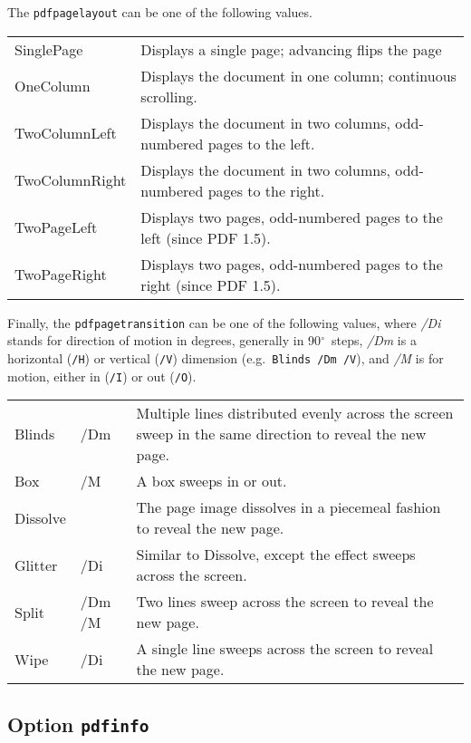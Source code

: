 \documentclass[pdftex]{article}
\begin{document}
The \texttt{pdfpagelayout} can be one of the following values.

\begin{longtable}{@{}>{\ttfamily}lp{10cm}@{}}
SinglePage     & Displays a single page; advancing flips the page \\
OneColumn      & Displays the document in one column; continuous scrolling. \\
TwoColumnLeft  & Displays the document in two columns, odd-numbered pages to the left. \\
TwoColumnRight & Displays the document in two columns, odd-numbered pages to the right.\\
TwoPageLeft    & Displays two pages, odd-numbered pages to the left (since PDF 1.5).\\
TwoPageRight   & Displays two pages, odd-numbered pages to the right (since PDF 1.5).
\end{longtable}

Finally, the \texttt{pdfpagetransition} can be one of the following
values, where \textit{/Di} stands for direction of motion in degrees,
generally in 90$^{\circ}$\ steps, \textit{/Dm} is a horizontal
(\texttt{/H}) or vertical (\texttt{/V}) dimension (e.g.\ \texttt{Blinds
/Dm /V}), and \textit{/M} is for motion, either in (\texttt{/I}) or out
(\texttt{/O}).

\begin{longtable}{@{}>{\ttfamily}llp{8.5cm}@{}}
Blinds   & /Dm    & Multiple lines distributed evenly across the screen sweep in the same direction to reveal the new
                    page. \\
Box      & /M     & A box sweeps in or out. \\
Dissolve &        & The page image dissolves in a piecemeal fashion to reveal the new page. \\
Glitter  & /Di    & Similar to Dissolve, except the effect sweeps across the screen. \\
Split    & /Dm /M & Two lines sweep across the screen to reveal the new page. \\
Wipe     & /Di    & A single line sweeps across the screen to reveal the new page.
\end{longtable}

\subsection{Option \texttt{pdfinfo}}
\end{document}
